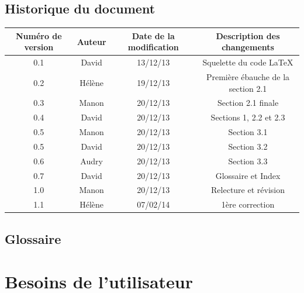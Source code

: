 \documentclass[a4paper,titlepage]{scrreprt}
\begin{document}
\section{Historique du document}
  \begin{tabular}{|c|c|c|c|}
    \hline
    Numéro de version & Auteur & Date de la modification & Description des changements \\
    \hline
    0.1 & David & 13/12/13 & Squelette du code \LaTeX \\
    0.2 & Hélène & 19/12/13 & Première ébauche de la section 2.1 \\
    0.3 & Manon & 20/12/13 & Section 2.1 finale \\
    0.4 & David & 20/12/13 & Sections 1,  2.2 et 2.3 \\
    0.5 & Manon & 20/12/13 & Section 3.1 \\
    0.5 & David & 20/12/13 & Section 3.2 \\
    0.6 & Audry & 20/12/13 & Section 3.3 \\
    0.7 & David & 20/12/13 & Glossaire et Index \\
    1.0 & Manon & 20/12/13 & Relecture et révision \\
    1.1 & Hélène & 07/02/14 & 1ère correction \\
    \hline
  \end{tabular}


\section{Glossaire}
  \removepagebreak
  \printglossaries
  \restorepagebreak
\chapter{Besoins de l'utilisateur}
  
\end{document}
